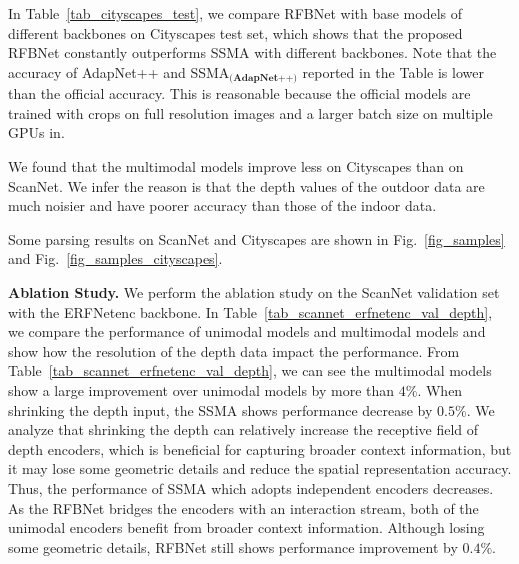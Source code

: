 \documentclass[letterpaper, 10 pt, conference]{ieeeconf}
\begin{document}
	In Table~\ref{tab_cityscapes_test}, we compare RFBNet with base models of different backbones on Cityscapes test set, which shows that the proposed RFBNet constantly outperforms SSMA with different backbones. Note that the accuracy of AdapNet++ and SSMA$_{\textbf{(AdapNet++)}}$ reported in the Table is lower than the official accuracy. This is reasonable because the official models are trained with crops on full resolution images and a larger batch size on multiple GPUs in\cite{valada2019self}.
	
	
	We found that the multimodal models improve less on Cityscapes than on ScanNet. We infer the reason is that the depth values of the outdoor data are much noisier and have poorer accuracy than those of the indoor data.
	
	Some parsing results on ScanNet and Cityscapes are shown in Fig.~\ref{fig_samples} and Fig.~\ref{fig_samples_cityscapes}.
	
	\textbf{Ablation Study.} We perform the ablation study on the ScanNet validation set with the ERFNetenc backbone. In Table~\ref{tab_scannet_erfnetenc_val_depth}, we compare the performance of unimodal models and multimodal models and show how the resolution of the depth data impact the performance. From Table~\ref{tab_scannet_erfnetenc_val_depth}, we can see the multimodal models show a large improvement over unimodal models by more than $4\%$. When shrinking the depth input, the SSMA shows performance decrease by $0.5\%$. We analyze that shrinking the depth can relatively increase the receptive field of depth encoders, which is beneficial for capturing broader context information, but it may lose some geometric details and reduce the spatial representation accuracy. Thus, the performance of SSMA which adopts independent encoders decreases. As the RFBNet bridges the encoders with an interaction stream, both of the unimodal encoders benefit from broader context information. Although losing some geometric details, RFBNet still shows performance improvement by $0.4\%$.
	
\end{document}
